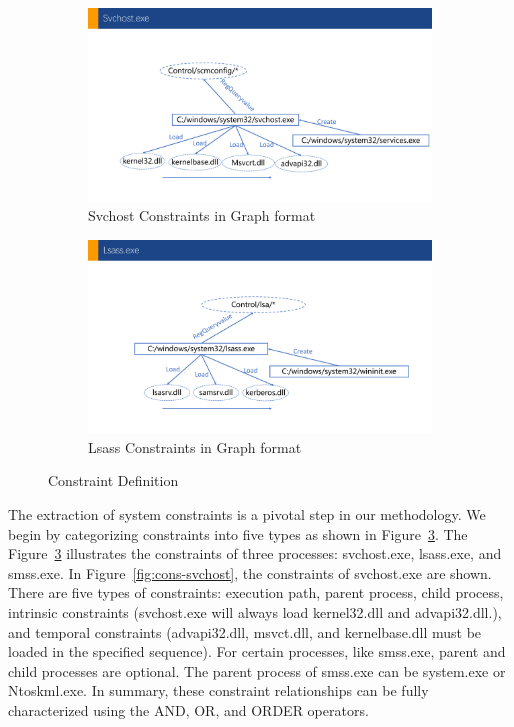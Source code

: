 \begin{figure}[h]
  \begin{subfigure}{.5\textwidth}
      \includegraphics[width=\textwidth]{figs/svchost.pdf}
      \caption{Svchost Constraints in Graph format}
      \label{fig:con-svchost-tree}
  \end{subfigure}
  \hfill
  \begin{subfigure}{.5\textwidth}
      \includegraphics[width=\textwidth]{figs/lsass.pdf}
      \caption{Lsass Constraints in Graph format}
      \label{fig:con-lsass}
  \end{subfigure}
  \caption{Constraint Definition}
  \label{fig:cons-def}
 \end{figure}


The extraction of system constraints is a pivotal step in our methodology. We begin by categorizing constraints into five types as shown in Figure~\ref{fig:cons-def}.
The Figure~\ref{fig:cons-def} illustrates the constraints of three processes: svchost.exe, lsass.exe, and smss.exe. In Figure~\ref{fig:cons-svchost}, the constraints of svchost.exe are shown. There are five types of constraints: execution path, parent process, child process, intrinsic constraints (svchost.exe will always load kernel32.dll and advapi32.dll.), and temporal constraints (advapi32.dll, msvct.dll, and kernelbase.dll must be loaded in the specified sequence).
For certain processes, like smss.exe, parent and child processes are optional. The parent process of smss.exe can be system.exe or Ntoskml.exe.
In summary, these constraint relationships can be fully characterized using the AND, OR, and ORDER operators.

